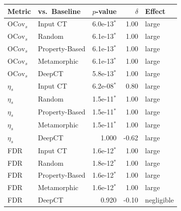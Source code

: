 \begin{tabular}{llrrl}
\toprule
Metric & vs.\ Baseline & $p$-value & $\delta$ & Effect \\
\midrule
$\mathrm{OCov}_s$ & Input CT & 6.0e-13$^{*}$ & 1.00 & large \\
$\mathrm{OCov}_s$ & Random & 6.1e-13$^{*}$ & 1.00 & large \\
$\mathrm{OCov}_s$ & Property-Based & 6.1e-13$^{*}$ & 1.00 & large \\
$\mathrm{OCov}_s$ & Metamorphic & 6.1e-13$^{*}$ & 1.00 & large \\
$\mathrm{OCov}_s$ & DeepCT & 5.8e-13$^{*}$ & 1.00 & large \\
$\eta_s$ & Input CT & 6.2e-08$^{*}$ & 0.80 & large \\
$\eta_s$ & Random & 1.5e-11$^{*}$ & 1.00 & large \\
$\eta_s$ & Property-Based & 1.5e-11$^{*}$ & 1.00 & large \\
$\eta_s$ & Metamorphic & 1.5e-11$^{*}$ & 1.00 & large \\
$\eta_s$ & DeepCT & 1.000 & -0.62 & large \\
FDR & Input CT & 1.6e-12$^{*}$ & 1.00 & large \\
FDR & Random & 1.8e-12$^{*}$ & 1.00 & large \\
FDR & Property-Based & 1.6e-12$^{*}$ & 1.00 & large \\
FDR & Metamorphic & 1.6e-12$^{*}$ & 1.00 & large \\
FDR & DeepCT & 0.920 & -0.10 & negligible \\
\bottomrule
\end{tabular}